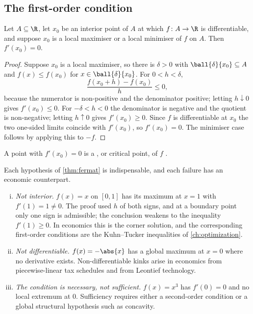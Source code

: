 \subsection{The first-order condition}

\begin{theorem}[Fermat]\label{thm:fermat}
	Let $A\subseteq\R$, let $x_0$ be an interior point of $A$ at which
	$f\colon A\to\R$ is differentiable, and suppose $x_0$ is a local maximiser or a
	local minimiser of $f$ on $A$. Then $f'(x_0)=0$.
\end{theorem}

\begin{proof}
	Suppose $x_0$ is a local maximiser, so there is $\delta>0$ with
	$\ball{\delta}{x_0}\subseteq A$ and $f(x)\leq f(x_0)$ for
	$x\in\ball{\delta}{x_0}$. For $0<h<\delta$,
	\[
		\frac{f(x_0+h)-f(x_0)}{h}\leq0,
	\]
	because the numerator is non-positive and the denominator positive; letting
	$h\downarrow0$ gives $f'(x_0)\leq0$. For $-\delta<h<0$ the denominator is
	negative and the quotient is non-negative; letting $h\uparrow0$ gives
	$f'(x_0)\geq0$. Since $f$ is differentiable at $x_0$ the two one-sided limits
	coincide with $f'(x_0)$, so $f'(x_0)=0$. The minimiser case follows by applying
	this to $-f$.
\end{proof}

A point with $f'(x_0)=0$ is a , or
critical point, of $f$ \autocite[slide 5]{fukuda2026calculus}.

\begin{remark}\label{rem:foc-failures}
	Each hypothesis of \autoref{thm:fermat} is indispensable, and each failure has
	an economic counterpart.
	\begin{enumerate}[(i)]
		\item \emph{Not interior.} $f(x)=x$ on $[0,1]$ has its maximum at $x=1$ with
		      $f'(1)=1\neq0$. The proof used $h$ of both signs, and at a boundary point
		      only one sign is admissible; the conclusion weakens to the inequality
		      $f'(1)\geq0$. In economics this is the corner solution, and the
		      corresponding first-order conditions are the Kuhn--Tucker inequalities of
		      \autoref{ch:optimization}.
		\item \emph{Not differentiable.} $f(x)=-\abs{x}$ has a global maximum at
		      $x=0$ where no derivative exists. Non-differentiable kinks arise in
		      economics from piecewise-linear tax schedules and from Leontief technology.
		\item \emph{The condition is necessary, not sufficient.} $f(x)=x^3$ has
		      $f'(0)=0$ and no local extremum at $0$. Sufficiency requires either a
		      second-order condition or a global structural hypothesis such as concavity.
	\end{enumerate}
\end{remark}

